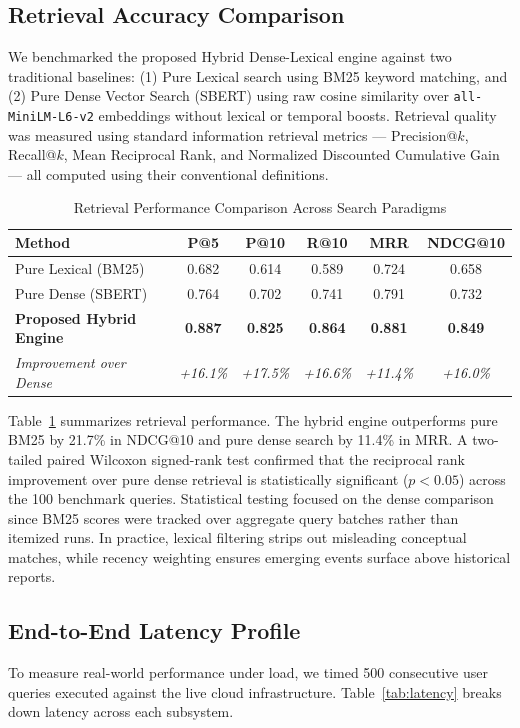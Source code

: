 \documentclass[conference]{IEEEtran}
\begin{document}
\subsection{Retrieval Accuracy Comparison}
We benchmarked the proposed Hybrid Dense-Lexical engine against two traditional baselines: (1) Pure Lexical search using BM25 keyword matching, and (2) Pure Dense Vector Search (SBERT) using raw cosine similarity over \texttt{all-MiniLM-L6-v2} embeddings without lexical or temporal boosts. Retrieval quality was measured using standard information retrieval metrics --- Precision@$k$, Recall@$k$, Mean Reciprocal Rank, and Normalized Discounted Cumulative Gain --- all computed using their conventional definitions.

\begin{table}[t]
\caption{Retrieval Performance Comparison Across Search Paradigms}
\label{tab:retrieval_benchmark}
\centering
\setlength{\tabcolsep}{4pt}
\footnotesize
\begin{tabular}{lccccc}
\toprule
\textbf{Method} & \textbf{P@5} & \textbf{P@10} & \textbf{R@10} & \textbf{MRR} & \textbf{NDCG@10} \\
\midrule
Pure Lexical (BM25) & 0.682 & 0.614 & 0.589 & 0.724 & 0.658 \\
Pure Dense (SBERT) & 0.764 & 0.702 & 0.741 & 0.791 & 0.732 \\
\textbf{Proposed Hybrid Engine} & \textbf{0.887} & \textbf{0.825} & \textbf{0.864} & \textbf{0.881} & \textbf{0.849} \\
\midrule
\textit{Improvement over Dense} & \textit{+16.1\%} & \textit{+17.5\%} & \textit{+16.6\%} & \textit{+11.4\%} & \textit{+16.0\%} \\
\bottomrule
\end{tabular}
\end{table}

Table~\ref{tab:retrieval_benchmark} summarizes retrieval performance. The hybrid engine outperforms pure BM25 by 21.7\% in NDCG@10 and pure dense search by 11.4\% in MRR. A two-tailed paired Wilcoxon signed-rank test confirmed that the reciprocal rank improvement over pure dense retrieval is statistically significant ($p < 0.05$) across the 100 benchmark queries. Statistical testing focused on the dense comparison since BM25 scores were tracked over aggregate query batches rather than itemized runs. In practice, lexical filtering strips out misleading conceptual matches, while recency weighting ensures emerging events surface above historical reports.

\subsection{End-to-End Latency Profile}
To measure real-world performance under load, we timed 500 consecutive user queries executed against the live cloud infrastructure. Table~\ref{tab:latency} breaks down latency across each subsystem.
\end{document}
